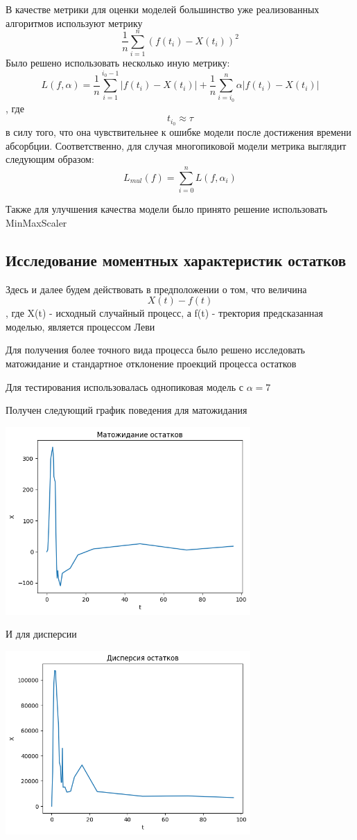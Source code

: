 \documentclass{article}
\begin{document}
В качестве метрики для оценки моделей большинство уже реализованных алгоритмов используют метрику \[
	\frac{1}{n}\sum_{i=1}^{n} (f(t_i) - X(t_i))^2
\] Было решено использовать несколько иную метрику: \[
	L(f, \alpha) = \frac{1}{n}\sum_{i=1}^{i_0-1} |f(t_i) - X(t_i)| +
	\frac{1}{n}\sum_{i=i_0}^{n} \alpha|f(t_i) - X(t_i)|
\], где \[
	t_{i_0} \approx \tau
\] в силу того, что она чувствительнее к ошибке модели после достижения времени абсорбции. Соответственно, для случая многопиковой модели метрика выглядит следующим образом: \[
	L_{mul}(f)  = \sum_{i=0}^{n} L(f, \alpha_i)
\]

Также для улучшения качества модели было принято решение использовать MinMaxScaler

\subsection{Исследование моментных характеристик остатков}

Здесь и далее будем действовать в предположении о том, что величина
\[
	X(t) - f(t)
\], где X(t) - исходный случайный процесс, а f(t) - тректория предсказанная моделью, является процессом Леви

Для получения более точного вида процесса было решено исследовать матожидание и стандартное отклонение проекций процесса остатков \newline\newline

Для тестирования использовалась однопиковая модель с $\alpha=7$ \newline

Получен следующий график поведения для матожидания

\includegraphics[width=0.7\textwidth, left]{mean.png}

И для дисперсии

\includegraphics[width=0.7\textwidth, left]{var.png}
\end{document}
